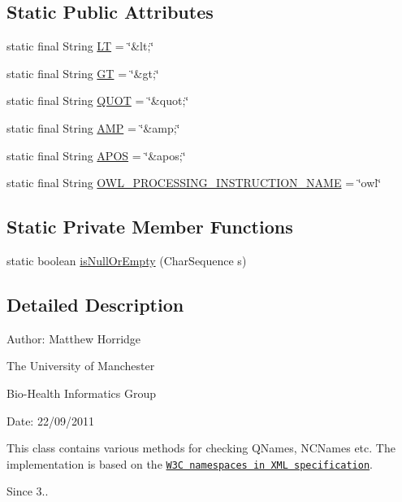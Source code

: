 \subsection*{Static Public Attributes}
\begin{DoxyCompactItemize}
\item 
static final String \hyperlink{classorg_1_1semanticweb_1_1owlapi_1_1io_1_1_x_m_l_utils_af4f65835d7ea196a6099d54941f414da}{L\-T} = \char`\"{}\&lt;\char`\"{}
\item 
static final String \hyperlink{classorg_1_1semanticweb_1_1owlapi_1_1io_1_1_x_m_l_utils_a4aab2e541e2e69068b596a4c264ff902}{G\-T} = \char`\"{}\&gt;\char`\"{}
\item 
static final String \hyperlink{classorg_1_1semanticweb_1_1owlapi_1_1io_1_1_x_m_l_utils_aa16b343553771638cc52792d68485836}{Q\-U\-O\-T} = \char`\"{}\&quot;\char`\"{}
\item 
static final String \hyperlink{classorg_1_1semanticweb_1_1owlapi_1_1io_1_1_x_m_l_utils_aa135209f27d327982e7aaff98db71933}{A\-M\-P} = \char`\"{}\&amp;\char`\"{}
\item 
static final String \hyperlink{classorg_1_1semanticweb_1_1owlapi_1_1io_1_1_x_m_l_utils_aa7cdf2c4b17d18847e2aacbf56eb8c92}{A\-P\-O\-S} = \char`\"{}\&apos;\char`\"{}
\item 
static final String \hyperlink{classorg_1_1semanticweb_1_1owlapi_1_1io_1_1_x_m_l_utils_a87819da169396d36b948e8458c64218c}{O\-W\-L\-\_\-\-P\-R\-O\-C\-E\-S\-S\-I\-N\-G\-\_\-\-I\-N\-S\-T\-R\-U\-C\-T\-I\-O\-N\-\_\-\-N\-A\-M\-E} = \char`\"{}owl\char`\"{}
\end{DoxyCompactItemize}
\subsection*{Static Private Member Functions}
\begin{DoxyCompactItemize}
\item 
static boolean \hyperlink{classorg_1_1semanticweb_1_1owlapi_1_1io_1_1_x_m_l_utils_a06872a1a0a22a7da9403880538ab5e7f}{is\-Null\-Or\-Empty} (Char\-Sequence s)
\end{DoxyCompactItemize}


\subsection{Detailed Description}
Author\-: Matthew Horridge\par
 The University of Manchester\par
 Bio-\/\-Health Informatics Group\par
 Date\-: 22/09/2011 \par
 This class contains various methods for checking Q\-Names, N\-C\-Names etc. The implementation is based on the \href{http://www.w3.org/TR/xml-names/}{\tt W3\-C namespaces in X\-M\-L specification}. \begin{DoxySince}{Since}
3.. 
\end{DoxySince}


